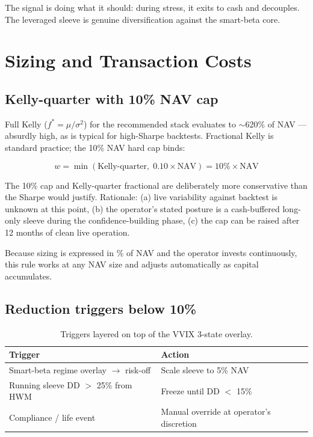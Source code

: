 \documentclass[11pt,a4paper]{article}
\begin{document}
The signal is doing what it should: during stress, it exits to cash and decouples. The leveraged sleeve is genuine diversification against the smart-beta core.

\section{Sizing and Transaction Costs}
\label{sec:sizing}

\subsection{Kelly-quarter with 10\% NAV cap}

Full Kelly ($f^* = \mu / \sigma^2$) for the recommended stack evaluates to $\sim$620\% of NAV --- absurdly high, as is typical for high-Sharpe backtests. Fractional Kelly is standard practice; the 10\% NAV hard cap binds:

\[
w = \min\left(\text{Kelly-quarter}, \; 0.10 \times \text{NAV}\right) = 10\% \times \text{NAV}
\]

The 10\% cap and Kelly-quarter fractional are deliberately more conservative than the Sharpe would justify. Rationale: (a) live variability against backtest is unknown at this point, (b) the operator's stated posture is a cash-buffered long-only sleeve during the confidence-building phase, (c) the cap can be raised after 12 months of clean live operation.

Because sizing is expressed in \% of NAV and the operator invests continuously, this rule works at any NAV size and adjusts automatically as capital accumulates.

\subsection{Reduction triggers below 10\%}

\begin{table}[H]
\centering
\small
\begin{tabular}{ll}
\toprule
\textbf{Trigger} & \textbf{Action} \\
\midrule
Smart-beta regime overlay $\to$ risk-off & Scale sleeve to 5\% NAV \\
Running sleeve DD $>$ 25\% from HWM & Freeze until DD $<$ 15\% \\
Compliance / life event & Manual override at operator's discretion \\
\bottomrule
\end{tabular}
\caption{Triggers layered on top of the VVIX 3-state overlay.}
\end{table}
\end{document}
